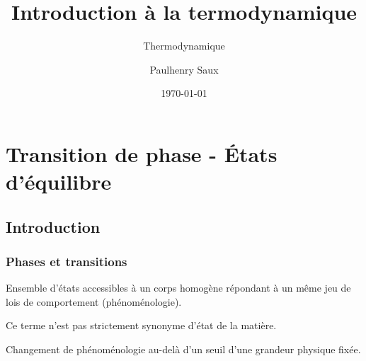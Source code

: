 \documentclass[french]{yLectureNote}
\title{Introduction à la termodynamique}
\subtitle{Thermodynamique}
\author{Paulhenry Saux}
\date{\today}
\begin{document}
\setcounter{chapter}{4}

\chapter{Transition de phase - États d'équilibre}





\section{Introduction}
\subsection{Phases et transitions}

\begin{definition}[Phase]
Ensemble d'états accessibles à un corps homogène répondant à un même jeu de lois de comportement (phénoménologie).
\end{definition}
Ce terme n'est pas strictement synonyme d'état de la matière.

\begin{definition}
Changement de phénoménologie au-delà d'un seuil d'une grandeur physique fixée. 
\end{definition}

\end{document}
